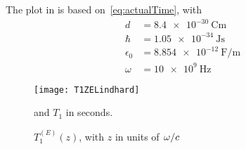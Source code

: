 \documentclass[11pt]{article}
\begin{document}
	The plot in  is based on~\eqref{eq:actualTime}, with
	\begin{align}
		d &= \SI{8.4e-30}{\coulomb \meter} \\
		\hbar &= \SI{1.05e-34}{\J \s} \\
		\epsilon_0 &= \SI{8.854e-12}{\farad\per\meter} \\
		\omega &= \SI{10e9}{\Hz}
	\end{align}
	\begin{figure}[htp]
		\centering
		\texttt{[image: T1ZELindhard]}
		\caption{$T_{1}^{(E)}(z)$, with $z$ in units of $\flatfrac{\omega}{c}$} and $T_1$ in seconds.\label{fig:t1ez}
	\end{figure}

	\newpage
	\listoftodos
	\newpage
	\printbibliography
\end{document}
